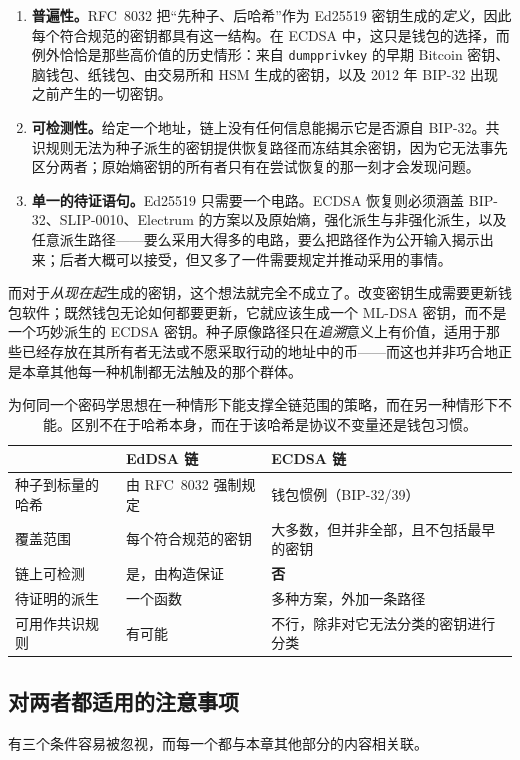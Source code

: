 \begin{enumerate}
  \item \textbf{普遍性。}RFC~8032 把“先种子、后哈希”作为 Ed25519 密钥生成的\emph{定义}，因此每个符合规范的密钥都具有这一结构。在 ECDSA 中，这只是钱包的选择，而例外恰恰是那些高价值的历史情形：来自 \texttt{dumpprivkey} 的早期 Bitcoin 密钥、脑钱包、纸钱包、由交易所和 HSM 生成的密钥，以及 2012 年 BIP-32 出现之前产生的一切密钥。
  \item \textbf{可检测性。}给定一个地址，链上没有任何信息能揭示它是否源自 BIP-32。共识规则无法为种子派生的密钥提供恢复路径而冻结其余密钥，因为它无法事先区分两者；原始熵密钥的所有者只有在尝试恢复的那一刻才会发现问题。
  \item \textbf{单一的待证语句。}Ed25519 只需要一个电路。ECDSA 恢复则必须涵盖 BIP-32、SLIP-0010、Electrum 的方案以及原始熵，强化派生与非强化派生，以及任意派生路径——要么采用大得多的电路，要么把路径作为公开输入揭示出来；后者大概可以接受，但又多了一件需要规定并推动采用的事情。
\end{enumerate}

而对于\emph{从现在起}生成的密钥，这个想法就完全不成立了。改变密钥生成需要更新钱包软件；既然钱包无论如何都要更新，它就应该生成一个 ML-DSA 密钥，而不是一个巧妙派生的 ECDSA 密钥。种子原像路径只在\emph{追溯}意义上有价值，适用于那些已经存放在其所有者无法或不愿采取行动的地址中的币——而这也并非巧合地正是本章其他每一种机制都无法触及的那个群体。

\begin{table}[H]
\centering
\small
\begin{tabular}{@{}p{3.4cm}p{5.0cm}p{5.4cm}@{}}
\toprule
 & \textbf{EdDSA 链} & \textbf{ECDSA 链} \\
\midrule
种子到标量的哈希 & 由 RFC~8032 强制规定 & 钱包惯例（BIP-32/39） \\
覆盖范围 & 每个符合规范的密钥 & 大多数，但并非全部，且不包括最早的密钥 \\
链上可检测 & 是，由构造保证 & \textbf{否} \\
待证明的派生 & 一个函数 & 多种方案，外加一条路径 \\
可用作共识规则 & 有可能 & 不行，除非对它无法分类的密钥进行分类 \\
\bottomrule
\end{tabular}
\caption{为何同一个密码学思想在一种情形下能支撑全链范围的策略，而在另一种情形下不能。区别不在于哈希本身，而在于该哈希是协议不变量还是钱包习惯。}
\label{tab:eddsa-ecdsa}
\end{table}

\subsection{对两者都适用的注意事项}
有三个条件容易被忽视，而每一个都与本章其他部分的内容相关联。

